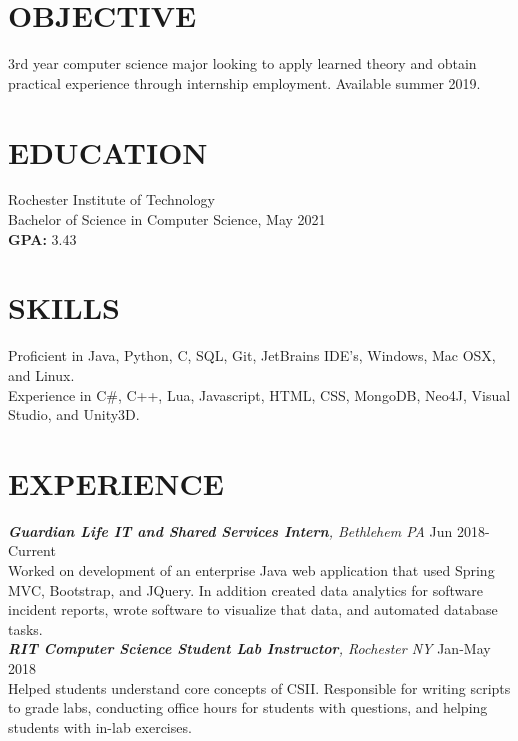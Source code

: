 \documentclass[line, margin]{res}
\begin{document}
\address{(484) 554-8487\\ emp9173@rit.edu}




 
 
 
\begin{resume}

\section{OBJECTIVE}
3rd year computer science major looking to apply learned theory and obtain practical experience through internship employment. Available summer 2019.

\section{EDUCATION} 
 Rochester Institute of Technology \\
 Bachelor of Science in Computer Science, May 2021\\
 \textbf{GPA:} 3.43
 
\section{SKILLS}
Proficient in Java, Python, C, SQL, Git, JetBrains IDE’s, Windows, Mac OSX, and Linux. \\
Experience in C\#, C++, Lua, Javascript, HTML, CSS, MongoDB, Neo4J, Visual Studio, and Unity3D.
 
\section{EXPERIENCE} 
\textit{\textbf{Guardian Life IT and Shared Services Intern}, Bethlehem PA} \hfill Jun 2018-Current \\
Worked on development of an enterprise Java web application that used Spring MVC, Bootstrap, and JQuery.  In addition created
data analytics for software incident reports, wrote software to visualize that data, and automated database tasks.\\ [10pt]
\textit{\textbf{RIT Computer Science Student Lab Instructor}, Rochester NY} \hfill Jan-May 2018 \\
Helped students understand core concepts of CSII. Responsible for writing scripts
to grade labs, conducting office hours for students with questions, and helping students
with in-lab exercises.


\end{resume}
\end{document}
